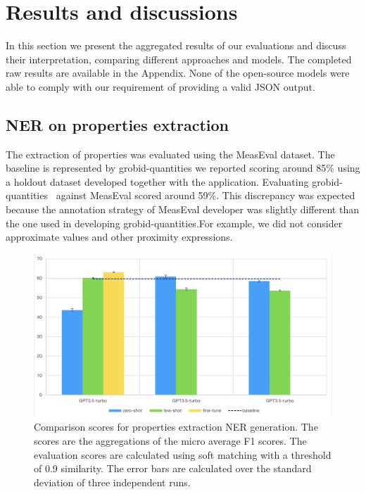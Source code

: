 \documentclass[a4paper]{article}
\begin{document}
\section{Results and discussions}
\label{sec:results}
In this section we present the aggregated results of our evaluations and discuss their interpretation, comparing different approaches and models. The completed raw results are available in the Appendix. 
None of the open-source models were able to comply with our requirement of providing a valid JSON output. 

\subsection{NER on properties extraction}
\label{sec:results-ner-properties}
The extraction of properties was evaluated using the MeasEval dataset. The baseline is represented by grobid-quantities we reported scoring around 85\% using a holdout dataset developed together with the application. Evaluating grobid-quantities~\cite{foppiano2019quantities} against MeasEval scored around 59\%. This discrepancy was expected because the annotation strategy of MeasEval developer was slightly different than the one used in developing grobid-quantities.For example, we did not consider approximate values and other proximity expressions.

\begin{figure}[htbp]
  \centering
  \includegraphics[width=1\textwidth]{figures/ner-measeval-all.png} 
  \caption{Comparison scores for properties extraction NER generation. The scores are the aggregations of the micro average F1 scores. The evaluation scores are calculated using soft matching with a threshold of 0.9 similarity. The error bars are calculated over the standard deviation of three independent runs.}
  \label{fig:ner-measeval-all}
\end{figure}
\end{document}
